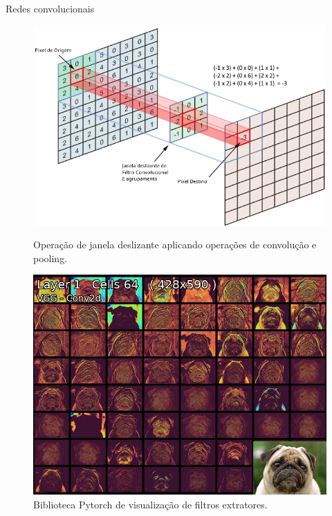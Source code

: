 \documentclass{beamer}
\begin{document}
\begin{frame}{Redes convolucionais}
    
    \begin{figure}[!ht]
        \centering
            \begin{minipage}{0.45\textwidth}
                \includegraphics[width=\columnwidth]{Imagens/operacao_conv.png}
                \caption{Operação de janela deslizante aplicando operações de convolução e pooling.}
            \end{minipage}
            \begin{minipage}{0.45\textwidth}
                \includegraphics[width=\columnwidth]{Imagens/mapextrackt.jpg}
                \caption{Biblioteca Pytorch de visualização de filtros extratores.}
            \end{minipage}
        \end{figure}  
        

\end{frame}
\end{document}
